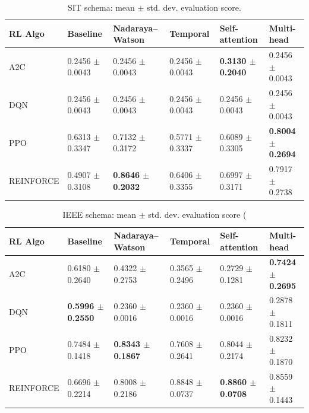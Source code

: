 \documentclass[sn-basic]{sn-jnl}%
\begin{document}
\begin{table}[htbp]
	\centering
	\caption{SIT schema: mean $\pm$ std. dev. evaluation score.}
	\label{tab:sit_main_results}
	\begin{tabular}{l l l l l l}
	\toprule
	\textbf{RL Algo} & \textbf{Baseline} & \textbf{Nadaraya--Watson} & \textbf{Temporal} & \textbf{Self-attention} & \textbf{Multi-head}\\
	\midrule
	A2C & 0.2456 $\pm$ 0.0043 & 0.2456 $\pm$ 0.0043 & 0.2456 $\pm$ 0.0043 & \textbf{0.3130 $\pm$ 0.2040} & 0.2456 $\pm$ 0.0043\\
	DQN & 0.2456 $\pm$ 0.0043 & 0.2456 $\pm$ 0.0043 & 0.2456 $\pm$ 0.0043 & 0.2456 $\pm$ 0.0043 & 0.2456 $\pm$ 0.0043\\
	PPO & 0.6313 $\pm$ 0.3347 & 0.7132 $\pm$ 0.3172 & 0.5771 $\pm$ 0.3337 & 0.6089 $\pm$ 0.3305 & \textbf{0.8004 $\pm$ 0.2694}\\
	REINFORCE & 0.4907 $\pm$ 0.3108 & \textbf{0.8646 $\pm$ 0.2032} & 0.6406 $\pm$ 0.3355 & 0.6997 $\pm$ 0.3171 & 0.7917 $\pm$ 0.2738\\
	\bottomrule
	\end{tabular}
\end{table}

\begin{table}[htbp]
	\centering
	\caption{IEEE schema: mean $\pm$ std. dev. evaluation score (}
	\label{tab:ieee_main_results}
	\begin{tabular}{l l l l l l}
	\toprule
	\textbf{RL Algo} & \textbf{Baseline} & \textbf{Nadaraya--Watson} & \textbf{Temporal} & \textbf{Self-attention} & \textbf{Multi-head}\\
	\midrule
	A2C & 0.6180 $\pm$ 0.2640 & 0.4322 $\pm$ 0.2753 & 0.3565 $\pm$ 0.2496 & 0.2729 $\pm$ 0.1281 & \textbf{0.7424 $\pm$ 0.2695}\\
	DQN & \textbf{0.5996 $\pm$ 0.2550} & 0.2360 $\pm$ 0.0016 & 0.2360 $\pm$ 0.0016 & 0.2360 $\pm$ 0.0016 & 0.2878 $\pm$ 0.1811\\
	PPO & 0.7484 $\pm$ 0.1418 & \textbf{0.8343 $\pm$ 0.1867} & 0.7608 $\pm$ 0.2641 & 0.8044 $\pm$ 0.2174 & 0.8232 $\pm$ 0.1870\\
	REINFORCE & 0.6696 $\pm$ 0.2214 & 0.8008 $\pm$ 0.2186 & 0.8848 $\pm$ 0.0737 & \textbf{0.8860 $\pm$ 0.0708} & 0.8559 $\pm$ 0.1443\\
	\bottomrule
	\end{tabular}
\end{table}
\end{document}
